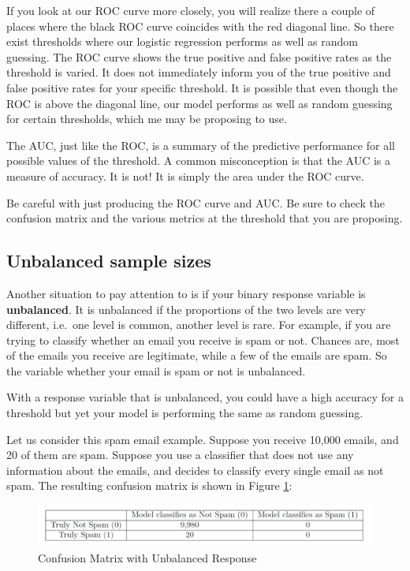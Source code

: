 \documentclass[
]{book}
\begin{document}
If you look at our ROC curve more closely, you will realize there a couple of places where the black ROC curve coincides with the red diagonal line. So there exist thresholds where our logistic regression performs as well as random guessing. The ROC curve shows the true positive and false positive rates as the threshold is varied. It does not immediately inform you of the true positive and false positive rates for your specific threshold. It is possible that even though the ROC is above the diagonal line, our model performs as well as random guessing for certain thresholds, which me may be proposing to use.

The AUC, just like the ROC, is a summary of the predictive performance for all possible values of the threshold. A common misconception is that the AUC is a measure of accuracy. It is not! It is simply the area under the ROC curve.

Be careful with just producing the ROC curve and AUC. Be sure to check the confusion matrix and the various metrics at the threshold that you are proposing.

\hypertarget{unbalanced-sample-sizes}{%
\subsection{Unbalanced sample sizes}\label{unbalanced-sample-sizes}}

Another situation to pay attention to is if your binary response variable is \textbf{unbalanced}. It is unbalanced if the proportions of the two levels are very different, i.e.~one level is common, another level is rare. For example, if you are trying to classify whether an email you receive is spam or not. Chances are, most of the emails you receive are legitimate, while a few of the emails are spam. So the variable whether your email is spam or not is unbalanced.

With a response variable that is unbalanced, you could have a high accuracy for a threshold but yet your model is performing the same as random guessing.

Let us consider this spam email example. Suppose you receive 10,000 emails, and 20 of them are spam. Suppose you use a classifier that does not use any information about the emails, and decides to classify every single email as not spam. The resulting confusion matrix is shown in Figure \ref{fig:12conf2}:

\begin{figure}
\centering
\includegraphics{images/12conf2.jpg}
\caption{\label{fig:12conf2}Confusion Matrix with Unbalanced Response}
\end{figure}
\end{document}
